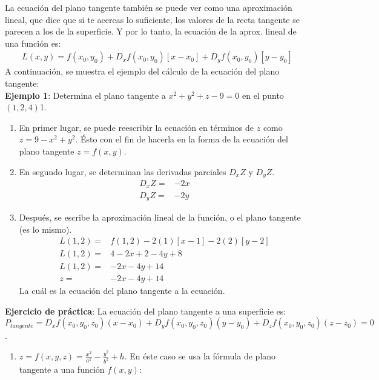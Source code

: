 \documentclass[12pt, letterpaper]{report}
\begin{document}
La ecuación del plano tangente también se puede ver como una aproximación lineal, que dice que si te acercas lo suficiente, los valores 
de la recta tangente se parecen a los de la superficie. Y por lo tanto, la ecuación de la aprox. lineal de una función es: 
\begin{align}
L(x, y) = f(x_0, y_0) + D_xf(x_0, y_0)[x-x_0] + D_yf(x_0, y_0)[y-y_0]
\end{align} A continuación, se muestra el ejemplo del cálculo de la ecuación del plano tangente: \\
\textbf{Ejemplo 1}: Determina el plano tangente a $x^2 + y^2 + z - 9 = 0$ en el punto $(1, 2, 4)$1.\\ 
\begin{enumerate}
\item En primer lugar, se puede reescribir la ecuación en términos de $z$ como $z = 9 - x^2 + y^2$. Ésto con el fin de hacerla en la forma de la ecuación del 
plano tangente $z = f(x, y)$. 
\item En segundo lugar, se determinan las derivadas parciales $D_xZ$ y $D_yZ$.
\begin{align*}
D_xZ =& -2x\\
D_yZ =& -2y
\end{align*}
\item Después, se escribe la aproximación lineal de la función, o el plano tangente (es lo mismo). 
\begin{align*}
L(1, 2) =& f(1, 2) - 2(1)[x - 1] -2(2)[y - 2]\\
L(1, 2) =& 4 -2x + 2 -4y + 8\\
L(1, 2) =& -2x -4y + 14\\ 
z =& -2x -4y + 14
\end{align*} La cuál es la ecuación del plano tangente a la ecuación. 
\end{enumerate}

\textbf{Ejercicio de práctica}: La ecuación del plano tangente a una superficie es: 
$P_{tangente} = D_xf(x_0, y_0, z_0)(x-x_0) + D_yf(x_0, y_0, z_0)(y-y_0) + D_zf(x_0, y_0, z_0)(z-z_0) = 0$. \\ 

\begin{enumerate}
    \item $z = f(x, y, z) = \frac{x^2}{a^2} - \frac{y^2}{b^2} + h$. 
    En éste caso se usa la fórmula de plano tangente a una función $f(x, y)$: 
     
\end{enumerate}
\end{document}
